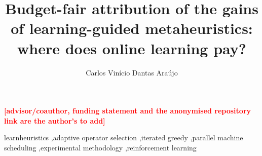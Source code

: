 \documentclass[preprint,12pt,authoryear]{elsarticle}
\newif\ifdraftmarks \draftmarkstrue
\newcommand{\todonote}[1]{\ifdraftmarks\textcolor{red}{\textbf{[#1]}}\fi}
\begin{document}
\begin{frontmatter}

\title{Budget-fair attribution of the gains of learning-guided metaheuristics: where does online learning pay?}

\author{Carlos Vin\'icio Dantas Ara\'ujo}
\address{Graduate Program in Computer Science, State University of Cear\'a (UECE), Fortaleza, Brazil}
\todonote{advisor/coauthor, funding statement and the anonymised repository link are the author's to add}

\begin{abstract}

\end{abstract}

\begin{keyword}
learnheuristics \sep adaptive operator selection \sep iterated greedy \sep parallel machine scheduling \sep experimental methodology \sep reinforcement learning
\end{keyword}
\end{frontmatter}

\onehalfspacing






\appendix





\end{document}
